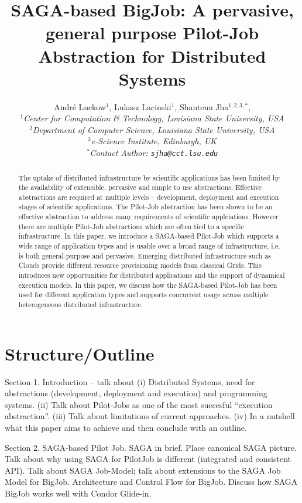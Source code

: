 \documentclass[conference,final]{IEEEtran}
\title{SAGA-based BigJob: A pervasive, general purpose Pilot-Job Abstraction for Distributed Systems}
\author{
Andr\'e Luckow$^{1}$, Lukasz Lacinski$^{1}$,   Shantenu Jha$^{1,2,3,*}$,\\
  \small{\emph{$^{1}$Center for Computation \& Technology, Louisiana State University, USA}}\\
  \small{\emph{$^{2}$Department of Computer Science, Louisiana State University, USA}}\\
  \small{\emph{$^{3}$e-Science Institute, Edinburgh, UK}}\\
  \small{\emph{$^{*}$Contact Author: \texttt{sjha@cct.lsu.edu}}}\\
}
\newcommand{\up}{\vspace*{-1em}}
\begin{document}
 

\maketitle    


\begin{abstract}
  The uptake of distributed infrastructure by scientific applications
  has been limited by the availability of extensible, pervasive and
  simple to use abstractions. Effective abstractions are required at
  multiple levels -- development, deployment and execution stages of
  scientific applications. The Pilot-Job abstraction has been shown to
  be an effective abstraction to address many requirements of
  scientific applciations. However there are multiple Pilot-Job
  abstractions which are often tied to a specific infrastructure.  In
  this paper, we introduce a SAGA-based Pilot-Job which supports a
  wide range of application types and is usable over a broad range of
  infrastructure, i.e. is both general-purpose and pervasive.
  Emerging distributed infrastructure such as Clouds provide different
  resource provisioning models from classical Grids. This introduces
  new opportunities for distributed applications and the support of
  dynamical execution models. In this paper, we discuss how the
  SAGA-based Pilot-Job has been used for different application types
  and supports concurrent usage across multiple heterogeneous
  distributed infrastructure.
\end{abstract}


\section*{Structure/Outline}

Section 1. Introduction -- talk about (i) Distributed Systems, need
for abstractions (development, deployment and execution) and
programming systems. (ii) Talk about Pilot-Jobs as one of the most
succesful ``execution abstraction''. (iii) Talk about limitations of
current approaches. (iv) In a nutshell what this paper aims to achieve
and then conclude with an outline.

\bigskip

Section 2. SAGA-based Pilot Job.  SAGA in brief. Place canonical SAGA
picture. Talk about why using SAGA for PilotJob is different
(integrated and consistent API). Talk about SAGA Job-Model; talk about
extensions to the SAGA Job Model for BigJob.  Architecture and Control
Flow for BigJob. Discuss how SAGA BigJob works well with Condor Glide-in.
\end{document}
